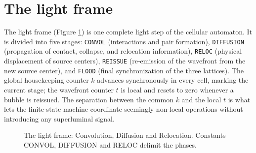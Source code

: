 \documentclass{ijuc}
\begin{document}
\section{The light frame}\label{sec:light-frame}

The light frame (Figure \ref{fig:light_frame}) is one complete light step of the cellular automaton. It is divided into five stages: \texttt{CONVOL} (interactions and pair formation), \texttt{DIFFUSION} (propagation of contact, collapse, and relocation information), \texttt{RELOC} (physical displacement of source centers), \texttt{REISSUE} (re-emission of the wavefront from the new source center), and \texttt{FLOOD} (final synchronization of the three lattices). The global housekeeping counter $k$ advances synchronously in every cell, marking the current stage; the wavefront counter $t$ is local and resets to zero whenever a bubble is reissued. The separation between the common $k$ and the local $t$ is what lets the finite-state machine coordinate seemingly non-local operations without introducing any superluminal signal.

\begin{figure}
\begin{center}

\end{center}

\caption{The light frame: Convolution, Diffusion and Relocation. Constants CONVOL, DIFFUSION and RELOC delimit the phases.}
\label{fig:light_frame}
\end{figure}
\end{document}
